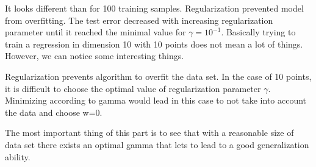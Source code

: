 \documentclass{article} %
\begin{document}
It looks different than for 100 training samples. Regularization prevented model from overfitting. The test error decreased with increasing regularization parameter until it reached the minimal value for $\gamma = 10^{-1}$. Basically trying to train a regression in dimension 10 with 10 points does not mean a lot of things. However, we can notice some interesting things. 

Regularization prevents algorithm to overfit the data set. In the case of 10 points, it is difficult to choose the optimal value of regularization parameter $\gamma$. Minimizing according to gamma would lead in this case to not take into account the data and choose w=0. 

The most important thing of this part is to see that with a reasonable size of data set there exists an optimal gamma that lets to lead to a good generalization ability. 
\end{document}
